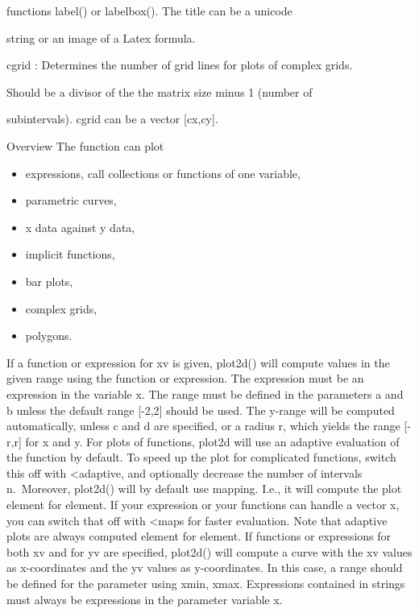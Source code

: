 \documentclass[
]{book}
\begin{document}
functions label() or labelbox(). The title can be a unicode

string or an image of a Latex formula.

cgrid : Determines the number of grid lines for plots of complex grids.

Should be a divisor of the the matrix size minus 1 (number of

subintervals). cgrid can be a vector {[}cx,cy{]}.

Overview The function can plot

\begin{itemize}
\item
  expressions, call collections or functions of one variable,
\item
  parametric curves,
\item
  x data against y data,
\item
  implicit functions,
\item
  bar plots,
\item
  complex grids,
\item
  polygons.
\end{itemize}

If a function or expression for xv is given, plot2d() will compute values in the given range using the function or expression. The expression must be an expression in the variable x. The range must be defined in the parameters a and b unless the default range {[}-2,2{]} should be used. The y-range will be computed automatically, unless c and d are specified, or a radius r, which yields the range {[}-r,r{]} for x and y. For plots of functions, plot2d will use an adaptive evaluation of the function by default. To speed up the plot for complicated functions, switch this off with \textless adaptive, and optionally decrease the number of intervals n.~Moreover, plot2d() will by default use mapping. I.e., it will compute the plot element for element. If your expression or your functions can handle a vector x, you can switch that off with \textless maps for faster evaluation. Note that adaptive plots are always computed element for element. If functions or expressions for both xv and for yv are specified, plot2d() will compute a curve with the xv values as x-coordinates and the yv values as y-coordinates. In this case, a range should be defined for the parameter using xmin, xmax. Expressions contained in strings must always be expressions in the parameter variable x.

\backmatter
\end{document}
